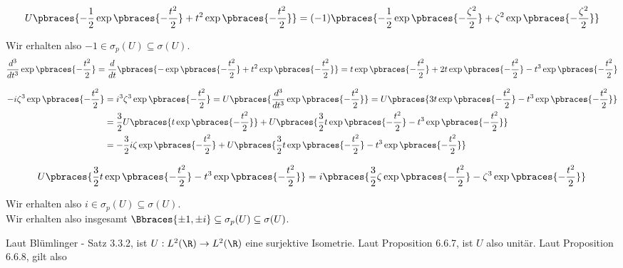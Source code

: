 \begin{solution}
\begin{align*}
  U \pbraces
  {
    -\frac{1}{2}
    \exp \pbraces{-\frac{t^2}{2}} +
    t^2 \exp \pbraces{-\frac{t^2}{2}}
  }
  =
  (-1) \pbraces
  {
    -\frac{1}{2}
    \exp \pbraces{-\frac{\zeta^2}{2}} +
    \zeta^2
    \exp \pbraces{-\frac{\zeta^2}{2}}
  }
\end{align*}

Wir erhalten also $-1 \in \sigma_p(U) \subseteq \sigma(U)$. \\

\begin{align*}
  \frac{d^3}{dt^3}
  \exp \pbraces{-\frac{t^2}{2}}
  =
  \frac{d}{dt}
  \pbraces
  {
    -\exp \pbraces{-\frac{t^2}{2}} +
    t^2 \exp \pbraces{-\frac{t^2}{2}}
  }
  =
  t \exp \pbraces{-\frac{t^2}{2}} +
  2 t \exp \pbraces{-\frac{t^2}{2}} -
  t^3 \exp \pbraces{-\frac{t^2}{2}}
\end{align*}

\begin{align*}
  -i \zeta^3 \exp \pbraces{-\frac{t^2}{2}}
  & =
  i^3 \zeta^3 \exp \pbraces{-\frac{t^2}{2}}
  =
  U \pbraces
  {
    \frac{d^3}{dt^3}
    \exp \pbraces{-\frac{t^2}{2}}
  }
  =
  U \pbraces
  {
    3 t \exp \pbraces{-\frac{t^2}{2}} -
    t^3 \exp \pbraces{-\frac{t^2}{2}}
  } \\
  & =
  \frac{3}{2}
  U \pbraces{t \exp \pbraces{-\frac{t^2}{2}}} +
  U \pbraces
  {
    \frac{3}{2}
    t \exp \pbraces{-\frac{t^2}{2}} -
    t^3 \exp \pbraces{-\frac{t^2}{2}}
  } \\
  & =
  -\frac{3}{2} i \zeta \exp \pbraces{-\frac{t^2}{2}} +
  U \pbraces
  {
    \frac{3}{2}
    t \exp \pbraces{-\frac{t^2}{2}} -
    t^3 \exp \pbraces{-\frac{t^2}{2}}
  }
\end{align*}

\begin{align*}
  U \pbraces
  {
    \frac{3}{2}
    t \exp \pbraces{-\frac{t^2}{2}} -
    t^3 \exp \pbraces{-\frac{t^2}{2}}
  }
  =
  i \pbraces
  {
    \frac{3}{2} \zeta \exp \pbraces{-\frac{t^2}{2}} -
    \zeta^3 \exp \pbraces{-\frac{t^2}{2}}
  }
\end{align*}

Wir erhalten also $i \in \sigma_p(U) \subseteq \sigma(U)$. \\
Wir erhalten also insgesamt $\Bbraces{\pm 1, \pm i} \subseteq \sigma_p(U) \subseteq \sigma(U)$.

\FloatBarrier
Laut Blümlinger - Satz 3.3.2, ist $U: L^2(\R) \to L^2(\R)$ eine surjektive Isometrie.
Laut Proposition 6.6.7, ist $U$ also unitär.
Laut Proposition 6.6.8, gilt also


\end{solution}
